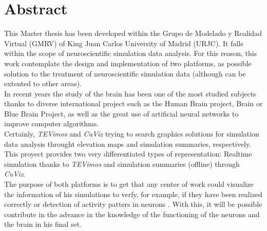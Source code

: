 \chapter{Abstract} \label{chapter:abstract}
This Master thesis has been developed within the Grupo de Modelado y Realidad Virtual (GMRV) of King Juan Carlos University of Madrid (URJC). It falls within the scope of neuroscientific simulation data analysis. For this reason, this work contemplate the design and implementation of two platforms, as possible solution to the treatment of neuroscientific simulation data (although can be extented to other areas).\\
In recent years the study of the brain has been one of the most studied subjects thanks to diverse international project such as the Human Brain project, Brain or Blue Brain Project, as well as the great use of artificial neural networks to improve computer algorithms.\\
Certainly, \textit{TEVimos} and \textit{CuViz} trying to search graphics solutions for simulation data analysis throught elevation maps and simulation summaries, respectively.\\
This proyect provides two very differentiated types of representation: Realtime simulation thanks to \textit{TEVimos} and simulation summaries (offline) through \textit{CuViz}.\\
The purpose of both platforms is to get that any center of work could visualize the information of his simulations to verfy, for example, if they have been realized correctly or detection of activity patters in neurons . With this, it will be possible contribute in the advance in the knowledge of the functioning of the neurons and the brain in his final set.
